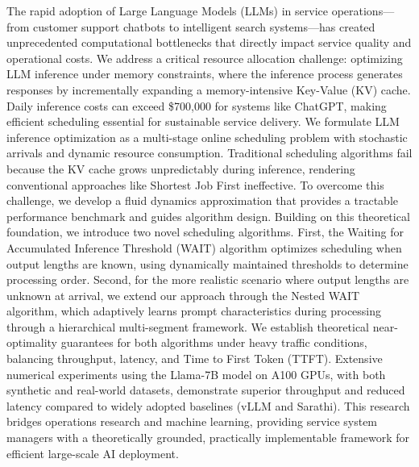 The rapid adoption of Large Language Models (LLMs) in service operations—from customer support chatbots to intelligent search systems—has created unprecedented computational bottlenecks that directly impact service quality and operational costs. We address a critical resource allocation challenge: optimizing LLM inference under memory constraints, where the inference process generates responses by incrementally expanding a memory-intensive Key-Value (KV) cache. Daily inference costs can exceed \$700,000 for systems like ChatGPT, making efficient scheduling essential for sustainable service delivery. We formulate LLM inference optimization as a multi-stage online scheduling problem with stochastic arrivals and dynamic resource consumption. Traditional scheduling algorithms fail because the KV cache grows unpredictably during inference, rendering conventional approaches like Shortest Job First ineffective. To overcome this challenge, we develop a fluid dynamics approximation that provides a tractable performance benchmark and guides algorithm design. Building on this theoretical foundation, we introduce two novel scheduling algorithms. First, the Waiting for Accumulated Inference Threshold (WAIT) algorithm optimizes scheduling when output lengths are known, using dynamically maintained thresholds to determine processing order. Second, for the more realistic scenario where output lengths are unknown at arrival, we extend our approach through the Nested WAIT algorithm, which adaptively learns prompt characteristics during processing through a hierarchical multi-segment framework. We establish theoretical near-optimality guarantees for both algorithms under heavy traffic conditions, balancing throughput, latency, and Time to First Token (TTFT). Extensive numerical experiments using the Llama-7B model on A100 GPUs, with both synthetic and real-world datasets, demonstrate superior throughput and reduced latency compared to widely adopted baselines (vLLM and Sarathi). This research bridges operations research and machine learning, providing service system managers with a theoretically grounded, practically implementable framework for efficient large-scale AI deployment.